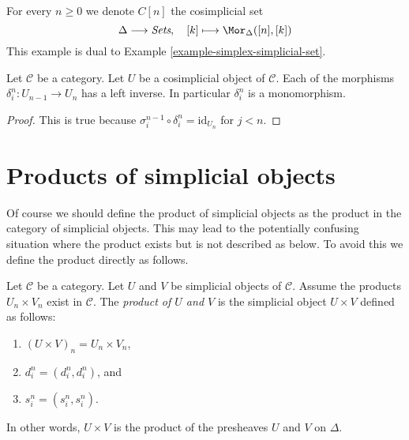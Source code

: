 \begin{example}
\label{example-simplex-cosimplicial-set}
For every $n \geq 0$ we denote $C[n]$ the cosimplicial set
$$
\Delta \longrightarrow \textit{Sets},\quad
[k] \longmapsto \Mor_{\Delta}([n], [k])
$$
This example is dual to Example \ref{example-simplex-simplicial-set}.
\end{example}

\begin{lemma}
\label{lemma-di-injective}
Let $\mathcal{C}$ be a category.
Let $U$ be a cosimplicial object of $\mathcal{C}$.
Each of the morphisms $\delta^n_i : U_{n - 1} \to U_n$
has a left inverse. In particular $\delta^n_i$ is a monomorphism.
\end{lemma}

\begin{proof}
This is true because
$\sigma_i^{n - 1} \circ \delta^n_i = \text{id}_{U_n}$
for $j < n$.
\end{proof}


























\section{Products of simplicial objects}
\label{section-products}

\noindent
Of course we should define the product of simplicial objects
as the product in the category of simplicial objects. This
may lead to the potentially confusing situation where the product exists
but is not described as below. To avoid this we define the product
directly as follows.

\begin{definition}
\label{definition-product}
Let $\mathcal{C}$ be a category.
Let $U$ and $V$ be simplicial objects of $\mathcal{C}$.
Assume the products $U_n \times V_n$ exist in $\mathcal{C}$.
The {\it product of $U$ and $V$} is the simplicial object
$U \times V$ defined as follows:
\begin{enumerate}
\item $(U \times V)_n = U_n \times V_n$,
\item $d^n_i = (d^n_i, d^n_i)$, and
\item $s^n_i = (s^n_i, s^n_i)$.
\end{enumerate}
In other words, $U \times V$ is the product of the presheaves
$U$ and $V$ on $\Delta$.
\end{definition}

